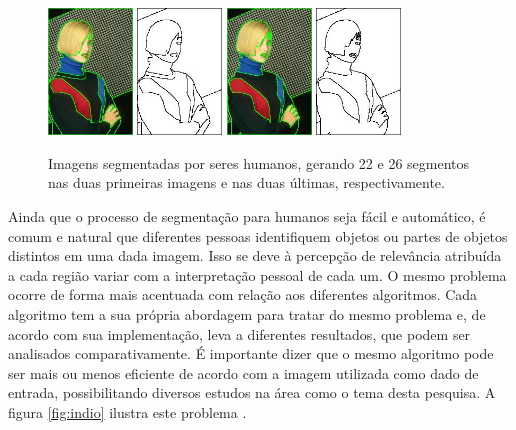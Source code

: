 \begin{figure}[!h]
 \centering
 \def\baselinestretch{1}\small\normalsize
 \includegraphics[width=0.2\textwidth]{img/198023-22-color.jpg}\qquad
 \includegraphics[width=0.2\textwidth]{img/198023-22.jpg}  \qquad
  \includegraphics[width=0.2\textwidth]{img/198023-26-color.jpg}  \qquad
 \includegraphics[width=0.2\textwidth]{img/198023-26.jpg}        
 \caption{\label{fig:Berkeley_mulher_segmentada2}Imagens segmentadas por seres humanos, gerando 22 e 26 segmentos nas duas primeiras imagens e nas duas últimas, respectivamente. \citep{Arbelez2011}}
\end{figure}




Ainda que o processo de segmentação para humanos seja fácil e automático, é comum e natural que diferentes pessoas identifiquem objetos ou partes de objetos distintos em uma dada imagem. Isso se deve à percepção de relevância atribuída a cada região variar com a interpretação pessoal de cada um. 
O mesmo problema ocorre de forma mais acentuada com relação aos diferentes algoritmos. Cada algoritmo tem a sua própria abordagem para tratar do mesmo problema e, de acordo com sua implementação, leva a diferentes resultados, que podem ser analisados comparativamente. É importante dizer que o mesmo algoritmo pode ser mais ou menos eficiente de acordo com a imagem utilizada como dado de entrada, possibilitando diversos estudos na área como o tema desta pesquisa. A figura \ref{fig:indio} ilustra este problema\citep{berkeley} . 

